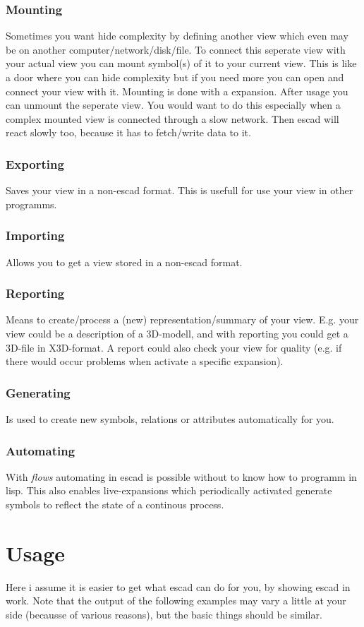 \documentclass[a4paper, 12pt, openany]{scrbook}
\begin{document}
\subsection{Mounting}
Sometimes you want hide complexity by defining another view which even may be on another computer/network/disk/file. To connect this seperate view with your actual view you can mount symbol(s) of it to your current view. This is like a door where you can hide complexity but if you need more you can open and connect your view with it. Mounting is done with a expansion. After usage you can unmount the seperate view. You would want to do this especially when a complex mounted view is connected through a slow network. Then escad will react slowly too, because it has to fetch/write data to it.
\subsection{Exporting}
Saves your view in a non-escad format. This is usefull for use your view in other programms.
\subsection{Importing}
Allows you to get a view stored in a non-escad format.
\subsection{Reporting}
Means to create/process a (new) representation/summary of your view. E.g. your view could be a description of a 3D-modell, and with reporting you could get a 3D-file in X3D-format. A report could also check your view for quality (e.g. if there would occur problems when activate a specific expansion).
\subsection{Generating}
Is used to create new symbols, relations or attributes automatically for you. 
\subsection{Automating}
With \emph{flows} automating in escad is possible without to know how to programm in lisp. This also enables live-expansions which periodically activated generate symbols to reflect the state of a continous process.
\chapter{Usage}
Here i assume it is easier to get what escad can do for you, by showing escad in work. Note that the output of the following examples may vary a little at your side (becausse of various reasons), but the basic things should be similar.
\end{document}
